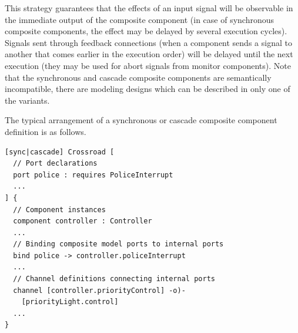 This strategy guarantees that the effects of an input signal will be observable in the immediate output of the composite component (in case of synchronous composite components, the effect may be delayed by several execution cycles). Signals sent through feedback connections (\ie when a component sends a signal to another that comes earlier in the execution order) will be delayed until the next execution (they may be used for \eg abort signals from monitor components). Note that the synchronous and cascade composite components are semantically incompatible, \ie there are modeling designs which can be described in only one of the variants.

The typical arrangement of a synchronous or cascade composite component definition is as follows.
\begin{lstlisting}
[sync|cascade] Crossroad [
  // Port declarations
  port police : requires PoliceInterrupt
  ...
] {
  // Component instances
  component controller : Controller
  ...
  // Binding composite model ports to internal ports
  bind police -> controller.policeInterrupt
  ...
  // Channel definitions connecting internal ports
  channel [controller.priorityControl] -o)-
    [priorityLight.control]
  ...
}
\end{lstlisting}

